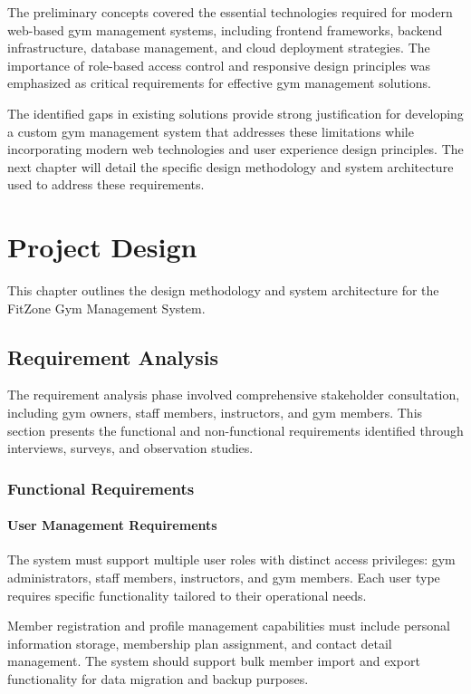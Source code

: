\documentclass[12pt,a4paper]{report}
\begin{document}
The preliminary concepts covered the essential technologies required for modern web-based gym management systems, including frontend frameworks, backend infrastructure, database management, and cloud deployment strategies. The importance of role-based access control and responsive design principles was emphasized as critical requirements for effective gym management solutions.

The identified gaps in existing solutions provide strong justification for developing a custom gym management system that addresses these limitations while incorporating modern web technologies and user experience design principles. The next chapter will detail the specific design methodology and system architecture used to address these requirements.

\chapter{Project Design}
\label{ch:project-design}

This chapter outlines the design methodology and system architecture for the FitZone Gym Management System.

\section{Requirement Analysis}
\label{sec:requirement-analysis}

The requirement analysis phase involved comprehensive stakeholder consultation, including gym owners, staff members, instructors, and gym members. This section presents the functional and non-functional requirements identified through interviews, surveys, and observation studies.

\subsection{Functional Requirements}

\subsubsection{User Management Requirements}

The system must support multiple user roles with distinct access privileges: gym administrators, staff members, instructors, and gym members. Each user type requires specific functionality tailored to their operational needs.

Member registration and profile management capabilities must include personal information storage, membership plan assignment, and contact detail management. The system should support bulk member import and export functionality for data migration and backup purposes.
\end{document}
